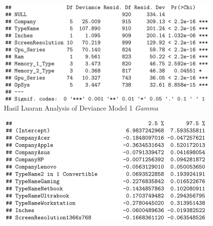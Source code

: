 \documentclass[12pt]{article}
\begin{document}
\begin{figure}[h!]
    \centering
    \includegraphics{Model_1_AOV.png}
    \caption{Hasil Luaran Analysis of Deviance Model 1 \textit{Gamma}}
    \label{fig:AOV}
\end{figure}
\begin{figure}[h!]
    \centering
    \includegraphics{Model_1_CI(1_5).png}
    \label{fig:CI11}
\end{figure}
\end{document}

